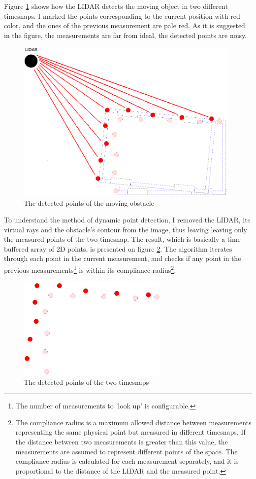 Figure \ref{obstacle_movement_lidar} shows how the LIDAR detects the moving object in two different timesnaps. I marked the points corresponding to the current position with red color, and the ones of the previous measurement are pale red. As it is suggested in the figure, the measurements are far from ideal, the detected points are noisy.

\begin{figure}[!ht]
    \centering
    \includegraphics[height=80mm]{figures/raw/obstacle_movement_lidar.png}
    \caption{The detected points of the moving obstacle}
    \label{obstacle_movement_lidar}
\end{figure}

To understand the method of dynamic point detection, I removed the LIDAR, its virtual rays and the obstacle's contour from the image, thus leaving leaving only the measured points of the two timesnap. The result, which is basically a time-buffered array of 2D points, is presented on figure \ref{obstacle_movement_lidar_only}. The algorithm iterates through each point in the current measurement, and checks if any point in the previous measurements\footnote{The number of measurements to 'look up' is configurable.} is within its compliance radius\footnote{The compliance radius is a maximum allowed distance between measurements representing the same physical point but measured in different timesnaps. If the distance between two measurements is greater than this value, the measurements are assumed to represent different points of the space. The compliance radius is calculated for each measurement separately, and it is proportional to the distance of the LIDAR and the measured point.}.

\begin{figure}[!ht]
    \centering
    \includegraphics[height=50mm]{figures/raw/obstacle_movement_lidar_only.png}
    \caption{The detected points of the two timesnaps}
    \label{obstacle_movement_lidar_only}
\end{figure}

